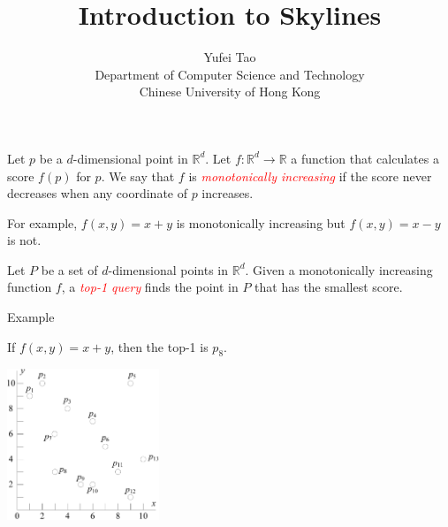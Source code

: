 \documentclass{beamer}
\title{Introduction to Skylines}
\author[]{Yufei Tao \\[2mm]
Department of Computer Science and Technology \\
Chinese University of Hong Kong}
\institute[]
{}
\newcommand{\red}[1]{\textcolor{red}{#1}}
\def\real{\mathbb{R}}
\begin{document}
    \begin{frame}
        \titlepage
    \end{frame}
    \begin{frame}
    \begin{small}
        \begin{definition}
            Let $p$ be a $d$-dimensional point in $\real^d$. Let $f: \real^d \rightarrow \real$ a function that calculates a score $f(p)$ for $p$. We say that $f$ is \red{\em monotonically increasing} if the score never decreases when any coordinate of $p$ increases.
        \end{definition}

        For example, $f(x, y) = x + y$ is monotonically increasing but $f(x, y) = x - y$ is not.

        \begin{definition}
            Let $P$ be a set of $d$-dimensional points in $\real^d$. Given a monotonically increasing function $f$, a \red{\em top-1 query} finds the point in $P$ that has the smallest score.
        \end{definition}
    \end{small}
    \end{frame}
    \begin{frame}{Example}
    \begin{small}
        If $f(x, y) = x + y$, then the top-1 is $p_8$.
        \begin{center}
            \includegraphics[height=45mm]{./artwork/data.pdf}
        \end{center}
    \end{small}
    \end{frame}
\end{document}
